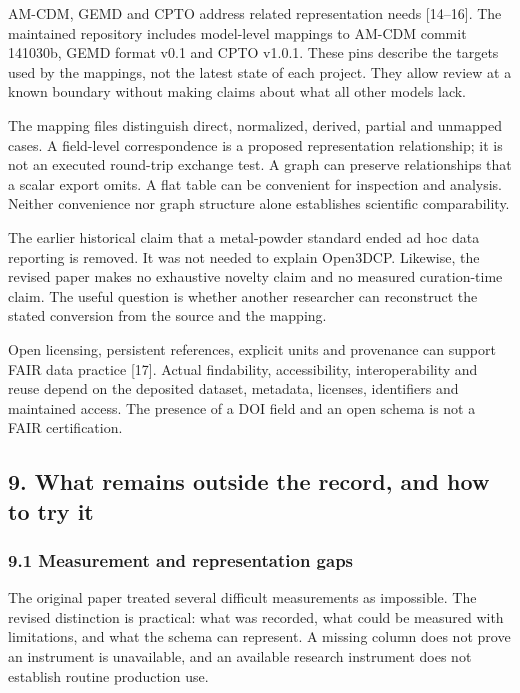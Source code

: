 \documentclass[
  american,
  11pt,
  letterpaper,
]{article}
\renewcommand{\texttt}[1]{{\ttfamily\fontsize{9.5}{11}\selectfont\hyphenchar\font=-1 #1}}
\begin{document}
AM-CDM, GEMD and CPTO address related representation needs {[}14--16{]}.
The maintained repository includes model-level mappings to AM-CDM commit
\texttt{141030b}, GEMD format v0.1 and CPTO v1.0.1. These pins describe
the targets used by the mappings, not the latest state of each project.
They allow review at a known boundary without making claims about what
all other models lack.

The mapping files distinguish direct, normalized, derived, partial and
unmapped cases. A field-level correspondence is a proposed
representation relationship; it is not an executed round-trip exchange
test. A graph can preserve relationships that a scalar export omits. A
flat table can be convenient for inspection and analysis. Neither
convenience nor graph structure alone establishes scientific
comparability.

The earlier historical claim that a metal-powder standard ended ad hoc
data reporting is removed. It was not needed to explain Open3DCP.
Likewise, the revised paper makes no exhaustive novelty claim and no
measured curation-time claim. The useful question is whether another
researcher can reconstruct the stated conversion from the source and the
mapping.

Open licensing, persistent references, explicit units and provenance can
support FAIR data practice {[}17{]}. Actual findability, accessibility,
interoperability and reuse depend on the deposited dataset, metadata,
licenses, identifiers and maintained access. The presence of a DOI field
and an open schema is not a FAIR certification.

\subsection{9. What remains outside the record, and how to try
it}\label{what-remains-outside-the-record-and-how-to-try-it}

\subsubsection{9.1 Measurement and representation
gaps}\label{measurement-and-representation-gaps}

The original paper treated several difficult measurements as impossible.
The revised distinction is practical: what was recorded, what could be
measured with limitations, and what the schema can represent. A missing
column does not prove an instrument is unavailable, and an available
research instrument does not establish routine production use.
\end{document}
